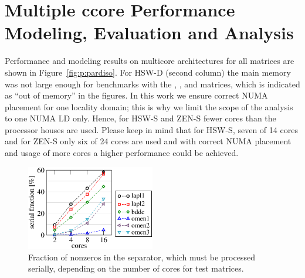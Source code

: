 
\section{Multiple ccore Performance Modeling, Evaluation and Analysis}
\label{sec:performance:multicore}

Performance and modeling results on multicore architectures for all matrices are shown in Figure~\ref{fig:p:pardiso}.
For HSW-D (second column) the main memory was not large enough for benchmarks
with the , , and  matrices, which is
indicated as ``out of memory'' in the figures.
%
%
In this work we ensure correct NUMA placement for one locality domain; this is why
we limit the scope of the analysis to one NUMA LD only. 
Hence, for HSW-S and ZEN-S fewer cores than the processor houses are used.
Please keep in mind that for HSW-S, seven of 14 cores and for ZEN-S only six of
24 cores are used and with correct NUMA placement and usage of more cores a
higher performance could be achieved.

\begin{figure}[t]%
  \centering%
  \includegraphics[width=0.5\textwidth,clip=true]{images/matrices-serial-fraction}%
  \caption{Fraction of nonzeros in the separator, which must be processed
   serially, depending on the number of cores for test matrices.  }%
  \label{fig:p:serial-fraciton}%
\end{figure}

